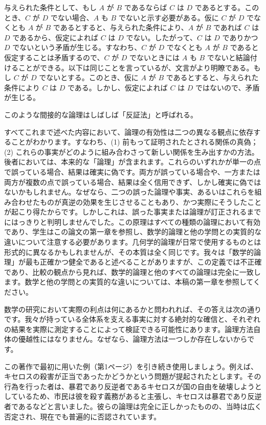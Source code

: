 \documentclass[a4paper,11pt,openany]{ltjsbook}
\begin{document}
与えられた条件として、もし \(A\) が \(B\) であるならば \(C\) は \(D\) であるとする。このとき、\(C\) が \(D\) でない場合、\(A\) も \(B\) でないと示す必要がある。仮に \(C\) が \(D\) でなくとも \(A\) が \(B\) であるとすると、与えられた条件により、\(A\) が \(B\) であれば \(C\) は \(D\) であるから、仮定によれば \(C\) は \(D\) でない。したがって、\(C\) は \(D\) でありかつ \(D\) でないという矛盾が生じる。すなわち、\(C\) が \(D\) でなくとも \(A\) が \(B\) であると仮定することは矛盾するので、\(C\) が \(D\) でないときには \(A\) も \(B\) でないと結論付けることができる。以下は同じことを言っているが、文言がより明瞭である。もし \(C\) が \(D\) でないとする。このとき、仮に \(A\) が \(B\) であるとすると、与えられた条件により \(C\) は \(D\) である。しかし、仮定によれば \(C\) は \(D\) ではないので、矛盾が生じる。

このような間接的な論理はしばしば「反証法」と呼ばれる。

すべてこれまで述べた内容において、論理の有効性は二つの異なる観点に依存することがわかります。すなわち、(1) 前もって証明されたとされる関係の真偽；(2) これらの事実がどのように組み合わさって新しい関係を生み出すかの方法。後者においては、本来的な「論理」が含まれます。これらのいずれかが単一の点で誤っている場合、結果は確実に偽です。両方が誤っている場合や、一方または両方が複数の点で誤っている場合、結果は全く信用できず、しかし確実に偽ではないかもしれません。なぜなら、二つの誤った論理や事実、あるいはこれらを組み合わせたものが真逆の効果を生じさせることもあり、かつ実際にそうしたことが起こり得たからです。しかしこれは、誤った事実または論理が訂正されるまでにはっきりと判明しませんでした。この原理はすべての種類の論理において有効であり、学生はこの論文の第一章を参照し、数学的論理と他の学問との実質的な違いについて注意する必要があります。几何学的論理が日常で使用するものとは形式的に異なるかもしれませんが、その本質は全く同じです。我々は「数学的論理」が最も正確かつ健全であると述べることがありますが、この定義では不正確であり、比較の観点から見れば、数学的論理と他のすべての論理は完全に一致します。数学と他の学問との実質的な違いについては、本稿の第一章を参照してください。

数学の研究において実際の利点は何にあるかと問われれば、その答えは次の通りです。我々が持っている全体系を支える事実に対する絶対的な確信と、それぞれの結果を実際に測定することによって検証できる可能性にあります。論理方法自体の優越性にはなりません。なぜなら、論理方法は一つしか存在しないからです。

この著作で最初に用いた例（第1ページ）を引き続き使用しましょう。例えば、キセロスの殺害が正当であったかどうかという問題が提起されたとします。その行為を行った者は、暴君であり反逆者であるキセロスが国の自由を破壊しようとしているため、市民は彼を殺す義務があると主張し、キセロスは暴君であり反逆者であるなどと言いました。彼らの論理は完全に正しかったものの、当時は広く否定され、現在でも普遍的に否認されています。
\end{document}
